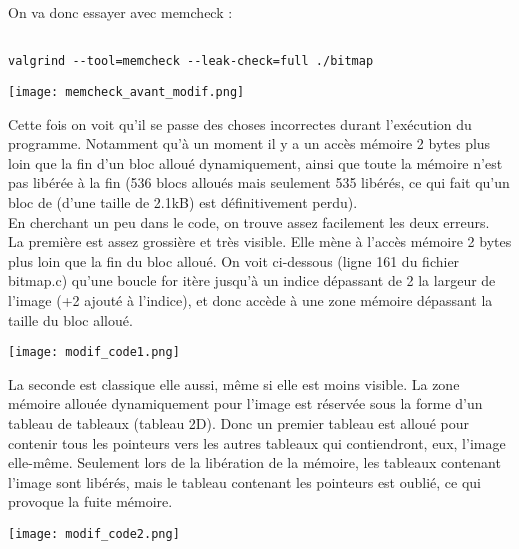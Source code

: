 On va donc essayer avec memcheck :
\begin{lstlisting}[frame=single,style=Console]  % Start your code-block

valgrind --tool=memcheck --leak-check=full ./bitmap
\end{lstlisting}
\begin{center} 
\hspace{15cm}
\texttt{[image: memcheck\_avant\_modif.png]}
\end{center}
\vspace{0.5cm}
Cette fois on voit qu'il se passe des choses incorrectes durant l'exécution du programme. Notamment qu'à un moment il y a un accès mémoire 2 bytes plus loin que la fin d'un bloc alloué dynamiquement, ainsi que toute la mémoire n'est pas libérée à la fin (536 blocs alloués mais seulement 535 libérés, ce qui fait qu'un bloc de (d'une taille de 2.1kB) est définitivement perdu).\\

En cherchant un peu dans le code, on trouve assez facilement les deux erreurs.\\

La première est assez grossière et très visible. Elle mène à l'accès mémoire 2 bytes plus loin que la fin du bloc alloué. On voit ci-dessous (ligne 161 du fichier bitmap.c) qu'une boucle for itère jusqu'à un indice dépassant de 2 la largeur de l'image (+2 ajouté à l'indice), et donc accède à une zone mémoire dépassant la taille du bloc alloué.
\begin{center} 
\hspace{15cm}
\texttt{[image: modif\_code1.png]}
\end{center}
\vspace{0.5cm}

La seconde est classique elle aussi, même si elle est moins visible. La zone mémoire allouée dynamiquement pour l'image est réservée sous la forme d'un tableau de tableaux (tableau 2D). Donc un premier tableau est alloué pour contenir tous les pointeurs vers les autres tableaux qui contiendront, eux, l'image elle-même. Seulement lors de la libération de la mémoire, les tableaux contenant l'image sont libérés, mais le tableau contenant les pointeurs est oublié, ce qui provoque la fuite mémoire.
\begin{center} 
\hspace{15cm}
\texttt{[image: modif\_code2.png]}
\end{center}
\vspace{0.5cm}

